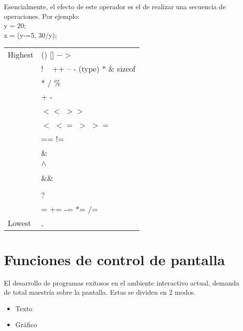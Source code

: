 \documentclass[]{article}
\begin{document}
			Esencialmente, el efecto de este operador es el de realizar una secuencia de operaciones. Por ejemplo:\\
			
			y = 20;\\
			
			x = (y-=5, 30/y);
			
			\begin{center}
				\begin{tabular}{l l}
					Highest & \hspace{50px} () [] $->$\\
					& \hspace{50px} ! ~ ++ -- - (type) * \& sizeof\\
					& \hspace{50px} * / \%\\
					& \hspace{50px} + -\\
					& \hspace{50px} $<<$ $>>$\\
					& \hspace{50px} $<$ $<=$ $>$ $>=$\\
					& \hspace{50px} == !=\\
					& \hspace{50px} \&\\
					& \hspace{50px} $\wedge$\\
					& \hspace{50px} \textbrokenbar\\
					& \hspace{50px} \&\&\\
					& \hspace{50px} \textbrokenbar\textbrokenbar\\
					& \hspace{50px} ?\\
					& \hspace{50px} = += -= *= /= \\
					Lowest & \hspace{50px} ,
				\end{tabular}
			\end{center}
		
		
	\section{Funciones de control de pantalla}
	
	El desarrollo de programas exitosos en el ambiente interactivo actual, demanda de total maestría sobre la pantalla. Estas se dividen en 2 modos.
	\begin{itemize}
		\item Texto
		\item Gráfico
	\end{itemize}
	
\end{document}
